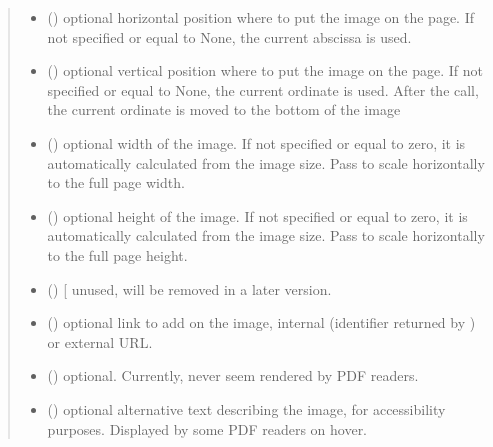 \documentclass[letterpaper,10pt,english]{sphinxmanual}
\begin{document}
\begin{fulllineitems}
\begin{fulllineitems}
\begin{quote}
\begin{description}
\begin{itemize}
\item {} 
\sphinxAtStartPar
{} () \textendash{} optional horizontal position where to put the image on the page.
If not specified or equal to None, the current abscissa is used.

\item {} 
\sphinxAtStartPar
{} () \textendash{} optional vertical position where to put the image on the page.
If not specified or equal to None, the current ordinate is used.
After the call, the current ordinate is moved to the bottom of the image

\item {} 
\sphinxAtStartPar
{} () \textendash{} optional width of the image. If not specified or equal to zero,
it is automatically calculated from the image size.
Pass  to scale horizontally to the full page width.

\item {} 
\sphinxAtStartPar
{} () \textendash{} optional height of the image. If not specified or equal to zero,
it is automatically calculated from the image size.
Pass  to scale horizontally to the full page height.

\item {} 
\sphinxAtStartPar
{} () \textendash{} {[}\sphinxstylestrong{DEPRECATED}{]} unused, will be removed in a later version.

\item {} 
\sphinxAtStartPar
{} () \textendash{} optional link to add on the image, internal
(identifier returned by ) or external URL.

\item {} 
\sphinxAtStartPar
{} () \textendash{} optional. Currently, never seem rendered by PDF readers.

\item {} 
\sphinxAtStartPar
{} () \textendash{} optional alternative text describing the image,
for accessibility purposes. Displayed by some PDF readers on hover.


\end{itemize}
\end{description}
\end{quote}
\end{fulllineitems}
\end{fulllineitems}
\end{document}
